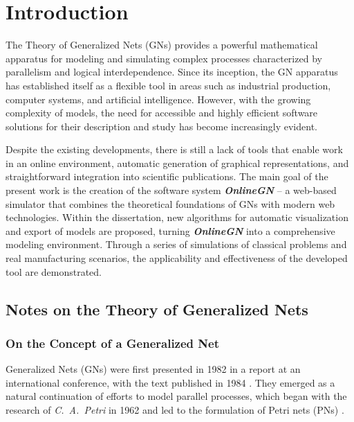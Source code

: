\clearpage
{}
{}

\section*{Introduction}

\hspace*{2.5em} The Theory of Generalized Nets (GNs) provides a powerful mathematical apparatus for modeling and simulating complex processes characterized by parallelism and logical interdependence. Since its inception, the GN apparatus has established itself as a flexible tool in areas such as industrial production, computer systems, and artificial intelligence. However, with the growing complexity of models, the need for accessible and highly efficient software solutions for their description and study has become increasingly evident.

Despite the existing developments, there is still a lack of tools that enable work in an online environment, automatic generation of graphical representations, and straightforward integration into scientific publications. The main goal of the present work is the creation of the software system \textbf{\textit{OnlineGN}} -- a web-based simulator that combines the theoretical foundations of GNs with modern web technologies. Within the dissertation, new algorithms for automatic visualization and export of models are proposed, turning \textbf{\textit{OnlineGN}} into a comprehensive modeling environment. Through a series of simulations of classical problems and real manufacturing scenarios, the applicability and effectiveness of the developed tool are demonstrated.



\subsection{Notes on the Theory of Generalized Nets}
\subsubsection{On the Concept of a Generalized Net}

\hspace*{2.5em}
Generalized Nets (GNs) were first presented in 1982 in a report at an international conference, with the text published in 1984 \cite{DIS-XY20}. They emerged as a natural continuation of efforts to model parallel processes, which began with the research of \textit{C.~A.~Petri} in 1962 and led to the formulation of Petri nets (PNs) \cite{DIS-XY1}.


